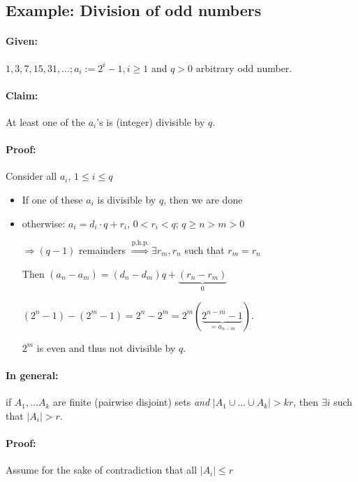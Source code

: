 \documentclass[11pt]{article}
\begin{document}
\subsection{Example: Division of odd numbers}

\paragraph{Given:} $ 1, 3, 7, 15, 31, \dots; a_i := 2^i - 1, i \geq 1 $ and $ q > 0 $ arbitrary odd number.

\paragraph{Claim:} At least one of the $ a_i $'s is (integer) divisible by $ q $.

\paragraph{Proof:} Consider all $ a_i $, $ 1 \leq i \leq q $
\begin{itemize}
\item If one of these $ a_i $ is divisible by $ q $, then we are done
\item otherwise: $ a_i = d_i \cdot q + r_i $, $ 0 < r_i < q $; $ q \geq n > m > 0 $

	$ \Rightarrow (q - 1) $ remainders $ \overset{\text{p.h.p.}}{\Rightarrow} \exists r_m, r_n $ such that $ r_m = r_n $
	
	Then $ (a_n - a_m) = (d_n - d_m) q + \underbrace{(r_n - r_m)}_{0} $
	
	$ (2^n - 1) - (2^m - 1) = 2^n - 2^m = 2^m(\underbrace{2^{n - m} - 1}_{= a_{n - m}}) $.
	
	$ 2^m $ is even and thus not divisible by $ q $.
\end{itemize}

\paragraph{In general:} if $ A_1, \dots A_k $ are finite (pairwise disjoint) sets \textit{and} $ | A_1 \cup \dots \cup A_k | > kr $, then $ \exists i $ such that $ | A_i | > r $.

\paragraph{Proof:} Assume for the sake of contradiction that all $ | A_i | \leq r $
\end{document}
